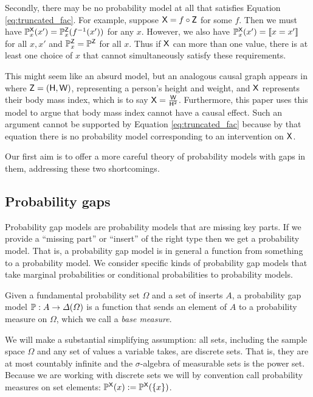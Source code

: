 Secondly, there may be no probability model at all that satisfies Equation \ref{eq:truncated_fac}. For example, suppose $\mathsf{X}=f\circ\mathsf{Z}$ for some $f$. Then we must have $\mathbb{P}^{\mathsf{X}}_x(x')=\mathbb{P}^{\mathsf{Z}}_x(f^{-1}(x'))$ for any $x$. However, we also have $\mathbb{P}^{\mathsf{X}}_x(x')=\llbracket x = x' \rrbracket$ for all $x,x'$ and $\mathbb{P}^{\mathsf{Z}}_x=\mathbb{P}^{\mathsf{Z}}$ for all $x$. Thus if $\mathsf{X}$ can more than one value, there is at least one choice of $x$ that cannot simultaneously satisfy these requirements.

This might seem like an absurd model, but an analogous causal graph appears in \citet{shahar_association_2009} where $\mathsf{Z}=(\mathsf{H},\mathsf{W})$, representing a person's height and weight, and $\mathsf{X}$ represents their body mass index, which is to say $\mathsf{X}=\frac{\mathsf{W}}{\mathsf{H}^2}$. Furthermore, this paper uses this model to argue that body mass index cannot have a causal effect. Such an argument cannot be supported by Equation \ref{eq:truncated_fac} because by that equation there is no probability model corresponding to an intervention on $\mathsf{X}$.

Our first aim is to offer a more careful theory of probability models with gaps in them, addressing these two shortcomings.

\subsection{Probability gaps}

Probability gap models are probability models that are missing key parts. If we provide a ``missing part'' or ``insert'' of the right type then we get a probability model. That is, a probability gap model is in general a function from something to a probability model. We consider specific kinds of probability gap models that take marginal probabilities or conditional probabilities to probability models.

\begin{definition}
Given a fundamental probability set $\Omega$ and a set of inserts $A$, a probability gap model $\mathbb{P}:A\to \Delta(\Omega)$ is a function that sends an element of $A$ to a probability measure on $\Omega$, which we call a \emph{base measure}.
\end{definition}

We will make a substantial simplifying assumption: all sets, including the sample space $\Omega$ and any set of values a variable takes, are discrete sets. That is, they are at most countably infinite and the $\sigma$-algebra of measurable sets is the power set. Because we are working with discrete sets we will by convention call probability measures on set elements: $\mathbb{P}^{\mathsf{X}}(x):=\mathbb{P}^{\mathsf{X}}(\{x\})$. 

